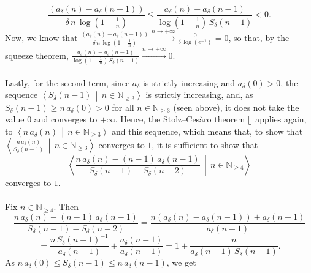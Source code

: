 \begin{solution}
    \[
        \frac{\left(a_\delta\left(n\right)-a_\delta\left(n-1\right)\right)}{\delta\,n\,\log\left(1-\frac{1}{n}\right)} \leq \frac{a_\delta\left(n\right)-a_\delta\left(n-1\right)}{\log\left(1-\frac{1}{n}\right)\,S_\delta\left(n-1\right)} < 0.
    \]
    Now, we know that \( \frac{\left(a_\delta\left(n\right)-a_\delta\left(n-1\right)\right)}{\delta\,n\,\log\left(1-\frac{1}{n}\right)} \overset{n \to +\infty}{\longrightarrow} \frac{0}{\delta\,\log\left(e^{-1}\right)} = 0 \), so that, by the squeeze theorem, \( \frac{a_\delta\left(n\right)-a_\delta\left(n-1\right)}{\log\left(1-\frac{1}{n}\right)\,S_\delta\left(n-1\right)} \overset{n \to +\infty}{\longrightarrow} 0 \).
    \\\\
    Lastly, for the second term, since \( a_\delta \) is strictly increasing and \( a_\delta\left(0\right) > 0 \), the sequence \( \left\langle S_\delta\left(n-1\right) \,\middle|\, n \in \mathbb{N}_{\geq 3} \right\rangle \) is strictly increasing, and, as \( S_\delta\left(n-1\right) \geq n\,a_\delta\left(0\right) > 0 \) for all \( n \in \mathbb{N}_{\geq 3} \) (seen above), it does not take the value \( 0 \) and converges to \( +\infty \). Hence, the Stolz–Ces\`aro theorem [] applies again, to \( \left\langle n\,a_\delta\left(n\right) \,\middle|\, n \in \mathbb{N}_{\geq 3} \right\rangle \) and this sequence, which means that, to show that \( \left\langle \frac{n\,a_\delta\left(n\right)}{S_\delta\left(n-1\right)} \,\middle|\, n \in \mathbb{N}_{\geq 3} \right\rangle \) converges to \( 1 \), it is sufficient to show that
    \[
        \left\langle \frac{n\,a_\delta\left(n\right)-\left(n-1\right)\,a_\delta\left(n-1\right)}{S_\delta\left(n-1\right)-S_\delta\left(n-2\right)} \,\middle|\, n \in \mathbb{N}_{\geq 4} \right\rangle
    \]
    converges to \( 1 \).
    \\\\
    Fix \( n \in \mathbb{N}_{\geq 4} \). Then
    \[
        \frac{n\,a_\delta\left(n\right)-\left(n-1\right)\,a_\delta\left(n-1\right)}{S_\delta\left(n-1\right)-S_\delta\left(n-2\right)} = \frac{n\left(a_\delta\left(n\right)-a_\delta\left(n-1\right)\right)+a_\delta\left(n-1\right)}{a_\delta\left(n-1\right)}
    \]
    \[
        = \frac{n\,S_\delta\left(n-1\right)^{-1}}{a_\delta\left(n-1\right)}+\frac{a_\delta\left(n-1\right)}{a_\delta\left(n-1\right)} = 1+\frac{n}{a_\delta\left(n-1\right)\,S_\delta\left(n-1\right)}.
    \]
    As \( n\,a_\delta\left(0\right) \leq S_\delta\left(n-1\right) \leq n\,a_\delta\left(n-1\right) \), we get

\end{solution}

